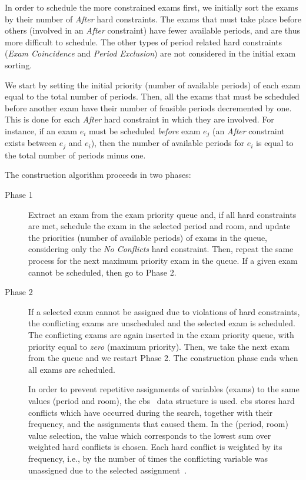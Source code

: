 In order to schedule the more constrained exams first, we initially sort the exams by their number of \textit{After} hard constraints. The exams that must take place before others (involved in an \textit{After} constraint) have fewer available periods, and are thus more difficult to schedule. The other types of period related hard constraints (\textit{Exam Coincidence} and \textit{Period Exclusion}) are not considered in the initial exam sorting.

We start by setting the initial priority (number of available periods) of each exam equal to the total number of periods. Then, all the exams that must be scheduled before another exam have their number of feasible periods decremented by one. This is done for each \textit{After} hard constraint in which they are involved. For instance, if an exam $e_i$ must be scheduled \textit{before} exam $e_j$ (an \textit{After} constraint exists between $e_j$ and $e_i$), then the number of available periods for $e_i$ is equal to the total number of periods minus one. 

The construction algorithm proceeds in two phases:
\begin{description}
	\item[Phase 1] Extract an exam from the exam priority queue and, if all hard constraints are met, schedule the exam in the selected period and room, and update the priorities (number of available periods) of exams in the queue, considering only the \textit{No Conflicts} hard constraint. Then, repeat the same process for the next maximum  priority exam in the queue. If a given exam cannot be scheduled, then go to Phase 2. 
	
	\item[Phase 2] If a selected exam cannot be assigned due to violations of hard constraints, the conflicting exams are unscheduled and the selected exam is scheduled. The conflicting exams are again inserted in the exam priority queue, with priority equal to \textit{zero} (maximum priority). Then, we take the next exam from the queue and we restart Phase 2. The construction phase ends when all exams are scheduled. 
	
	In order to prevent repetitive assignments of variables (exams) to the same values (period and room), the \gls{cbs}~\citep{Muller2009} data structure is used. \gls{cbs} stores hard conflicts which have occurred during the search, together with their frequency, and the assignments that caused them. In the (period, room) value selection, the value which corresponds to the lowest sum over weighted hard conflicts is chosen. Each hard conflict is weighted by its frequency, i.e., by the number of times the conflicting variable was unassigned due to the selected assignment~\citep{Muller2009}.
\end{description}

